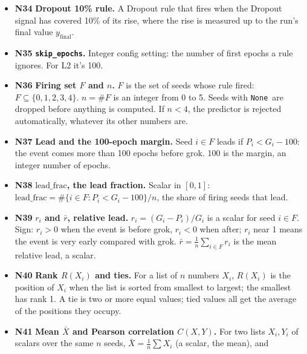 \documentclass[11pt,a4paper,oneside,openany]{report}
\newcommand{\leadfrac}{\mathrm{lead\_frac}}
\newcommand{\rbar}{\bar{r}}
\newcommand{\yfinal}{y_{\mathrm{final}}}
\newcommand{\ypeak}{y_{\mathrm{peak}}}
\newcommand{\ytarget}{y_{\mathrm{target}}}
\newcommand{\None}{\texttt{None}}
\newcommand{\code}[1]{\texttt{#1}}
\newcommand{\gl}[1]{\textbf{#1}}   %
\newenvironment{glist}{\begin{itemize}\setlength{\itemsep}{2pt}\setlength{\parskip}{1pt}}{\end{itemize}}
\begin{document}
\begin{glist}
\emph{MA-of-MA zero crossing}: a moving average applied to a moving average ($w = 20$), firing where that curve crosses zero, again after the first 100 epochs. Its events are $P = (1802, 1767, 1814, 1811, 1801)$. The exact curve that crosses zero is in the code file \code{l2\_\allowbreak{}norm.py}; you only need these $P$ values here.
\emph{Peak event}: the epoch where $S_t$ is largest; it lies between epochs 1038 and 1061 in every seed.
\emph{Halfway reading}: the first epoch after the peak where $S_t$ has fallen to $\ytarget = \ypeak - 0.5(\ypeak - \yfinal)$, with $y_t = S_t$.
\item[\gl{N34}] \textbf{Dropout 10\% rule.} A Dropout rule that fires when the Dropout signal has covered 10\% of its rise, where the rise is measured up to the run's final value $\yfinal$.
\item[\gl{N35}] \textbf{\code{skip\_\allowbreak{}epochs}.} Integer config setting: the number of first epochs a rule ignores. For L2 it's 100.
\item[\gl{N36}] \textbf{Firing set $F$ and $n$.} $F$ is the set of seeds whose rule fired: $F \subseteq \{0, 1, 2, 3, 4\}$. $n = \#F$ is an integer from 0 to 5. Seeds with \None\ are dropped before anything is computed. If $n < 4$, the predictor is rejected automatically, whatever its other numbers are.
\item[\gl{N37}] \textbf{Lead and the 100-epoch margin.} Seed $i \in F$ leads if $P_i < G_i - 100$: the event comes more than 100 epochs before grok. 100 is the margin, an integer number of epochs.
\item[\gl{N38}] \textbf{$\leadfrac$, the lead fraction.} Scalar in $[0, 1]$:
$\leadfrac = \#\{i \in F : P_i < G_i - 100\} / n$, the share of firing seeds that lead.
\item[\gl{N39}] \textbf{$r_i$ and $\rbar$, relative lead.} $r_i = (G_i - P_i)/G_i$ is a scalar for seed $i \in F$. Sign: $r_i > 0$ when the event is before grok, $r_i < 0$ when after; $r_i$ near 1 means the event is very early compared with grok. $\rbar = \frac{1}{n} \sum_{i \in F} r_i$ is the mean relative lead, a scalar.
\item[\gl{N40}] \textbf{Rank $R(X_i)$ and ties.} For a list of $n$ numbers $X_i$, $R(X_i)$ is the position of $X_i$ when the list is sorted from smallest to largest; the smallest has rank 1. A tie is two or more equal values; tied values all get the average of the positions they occupy.
\item[\gl{N41}] \textbf{Mean $\bar X$ and Pearson correlation $C(X, Y)$.} For two lists $X_i, Y_i$ of scalars over the same $n$ seeds, $\bar X = \frac{1}{n}\sum X_i$ (a scalar, the mean), and

\end{glist}
\end{document}
